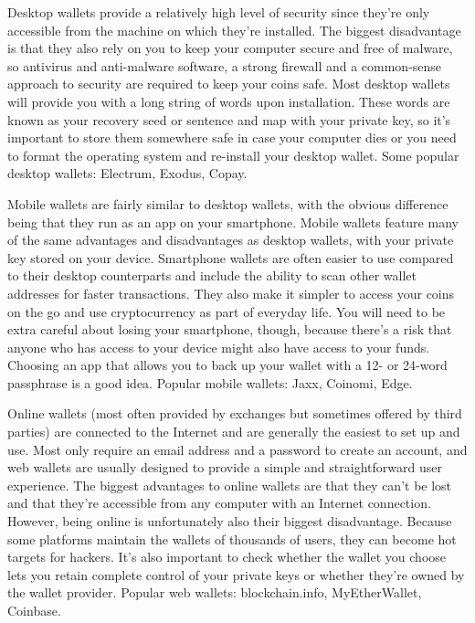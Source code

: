 Desktop wallets provide a relatively high level of security since they’re only accessible from the machine on which they’re installed. The biggest disadvantage is that they also rely on you to keep your computer secure and free of malware, so antivirus and anti-malware software, a strong firewall and a common-sense approach to security are required to keep your coins safe. Most desktop wallets will provide you with a long string of words upon installation. These words are known as your recovery seed or sentence and map with your private key, so it’s important to store them somewhere safe in case your computer dies or you need to format the operating system and re-install your desktop wallet. Some popular desktop wallets: Electrum, Exodus, Copay.

Mobile wallets are fairly similar to desktop wallets, with the obvious difference being that they run as an app on your smartphone. Mobile wallets feature many of the same advantages and disadvantages as desktop wallets, with your private key stored on your device. Smartphone wallets are often easier to use compared to their desktop counterparts and include the ability to scan other wallet addresses for faster transactions. They also make it simpler to access your coins on the go and use cryptocurrency as part of everyday life. You will need to be extra careful about losing your smartphone, though, because there’s a risk that anyone who has access to your device might also have access to your funds. Choosing an app that allows you to back up your wallet with a 12- or 24-word passphrase is a good idea. Popular mobile wallets: Jaxx, Coinomi, Edge.

Online wallets (most often provided by exchanges but sometimes offered by third parties) are connected to the Internet and are generally the easiest to set up and use. Most only require an email address and a password to create an account, and web wallets are usually designed to provide a simple and straightforward user experience. The biggest advantages to online wallets are that they can’t be lost and that they’re accessible from any computer with an Internet connection. However, being online is unfortunately also their biggest disadvantage. Because some platforms maintain the wallets of thousands of users, they can become hot targets for hackers. It’s also important to check whether the wallet you choose lets you retain complete control of your private keys or whether they’re owned by the wallet provider. Popular web wallets: blockchain.info, MyEtherWallet, Coinbase.

